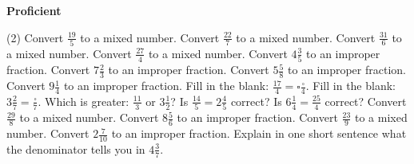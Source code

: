 \documentclass[17pt,a4paper,landscape]{extarticle}
\begin{document}
\sffamily
\boldmath

\boldmath

\vspace*{0.4em}
{\LARGE \textbf{Proficient}}
\begin{tasks}(2)
\task Convert \mbox{$\frac{19}{5}$} to a mixed number.
\task Convert \mbox{$\frac{22}{7}$} to a mixed number.
\task Convert \mbox{$\frac{31}{6}$} to a mixed number.
\task Convert \mbox{$\frac{27}{4}$} to a mixed number.
\task Convert \mbox{$4\frac{3}{5}$} to an improper fraction.
\task Convert \mbox{$7\frac{2}{3}$} to an improper fraction.
\task Convert \mbox{$5\frac{5}{8}$} to an improper fraction.
\task Convert \mbox{$9\frac{1}{4}$} to an improper fraction.
\task Fill in the blank: \mbox{$\frac{17}{4}=\square\frac{\square}{4}$}.
\task Fill in the blank: \mbox{$3\frac{2}{7}=\frac{\square}{7}$}.
\task Which is greater: \mbox{$\frac{11}{3}$} or \mbox{$3\frac{1}{2}$}?
\task Is \mbox{$\frac{14}{5}=2\frac{4}{5}$} correct?
\task Is \mbox{$6\frac{1}{4}=\frac{25}{4}$} correct?
\task Convert \mbox{$\frac{29}{8}$} to a mixed number.
\task Convert \mbox{$8\frac{5}{6}$} to an improper fraction.
\task Convert \mbox{$\frac{23}{9}$} to a mixed number.
\task Convert \mbox{$2\frac{7}{10}$} to an improper fraction.
\task Explain in one short sentence what the denominator tells you in \mbox{$4\frac{3}{7}$}.
\end{tasks}
\end{document}

